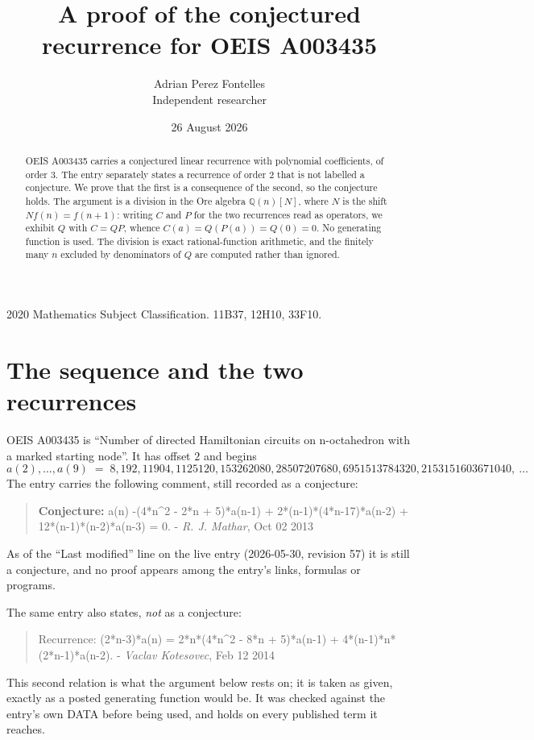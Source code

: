 \documentclass[11pt,a4paper]{article}
\title{A proof of the conjectured recurrence for OEIS A003435}
\author{Adrian Perez Fontelles\\ \small Independent researcher}
\date{26 August 2026}
\theoremstyle{plain}
\theoremstyle{definition}
\begin{document}
\maketitle

\begin{abstract}
OEIS A003435 carries a conjectured linear recurrence with polynomial coefficients, of
order 3. The entry separately states a recurrence of order 2 that is not
labelled a conjecture. We prove that the first is a consequence of the second, so the
conjecture holds. The argument is a division in the Ore algebra
$\mathbb{Q}(n)[N]$, where $N$ is the shift $Nf(n)=f(n+1)$: writing $C$ and $P$ for the two
recurrences read as operators, we exhibit $Q$ with $C=QP$, whence
$C(a)=Q(P(a))=Q(0)=0$. No generating function is used. The division is exact
rational-function arithmetic, and the finitely many $n$ excluded by denominators of $Q$
are computed rather than ignored.
\end{abstract}

\noindent\small 2020 Mathematics Subject Classification. 11B37, 12H10, 33F10.\normalsize

\section{The sequence and the two recurrences}

OEIS A003435 is ``Number of directed Hamiltonian circuits on n-octahedron with a marked starting node''. It has offset $2$ and begins
\[
a(2),\dots,a(9)\;=\;8, 192, 11904, 1125120, 153262080, 28507207680, 6951513784320, 2153151603671040,\ \dots
\]
The entry carries the following comment, still recorded as a conjecture:
\begin{quote}\small
\textbf{Conjecture:} a(n) -(4*n\^{}2 - 2*n + 5)*a(n-1) + 2*(n-1)*(4*n-17)*a(n-2) + 12*(n-1)*(n-2)*a(n-3) = 0. - \emph{R. J. Mathar}, Oct 02 2013
\end{quote}
As of the ``Last modified'' line on the live entry (2026-05-30, revision 57) it is still
a conjecture, and no proof appears among the entry's links, formulas or programs.

The same entry also states, \emph{not} as a conjecture:
\begin{quote}\small
Recurrence: (2*n-3)*a(n) = 2*n*(4*n\^{}2 - 8*n + 5)*a(n-1) + 4*(n-1)*n*(2*n-1)*a(n-2). - \emph{Vaclav Kotesovec}, Feb 12 2014
\end{quote}
This second relation is what the argument below rests on; it is taken as given, exactly as
a posted generating function would be. It was checked against the entry's own DATA before
being used, and holds on every published term it reaches.
\end{document}

